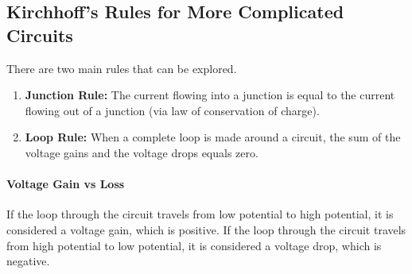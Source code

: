 \documentclass{scrartcl}
\theoremstyle{definition}
\begin{document}
	\subsection{Kirchhoff's Rules for More Complicated Circuits}
	
	\begin{theorem}
		There are two main rules that can be explored.
		\begin{enumerate}
			\item \textbf{Junction Rule: } The current flowing into a junction is equal to the current flowing out of a junction (via law of conservation of charge).
			
			\item \textbf{Loop Rule:} When a complete loop is made around a circuit, the sum of the voltage gains and the voltage drops equals zero.
		\end{enumerate}
	\end{theorem}
	
	\paragraph{Voltage Gain vs Loss} If the loop through the circuit travels from low potential to high potential, it is considered a voltage gain, which is positive. If the loop through the circuit travels from high potential to low potential, it is considered a voltage drop, which is negative.
	
\end{document}
